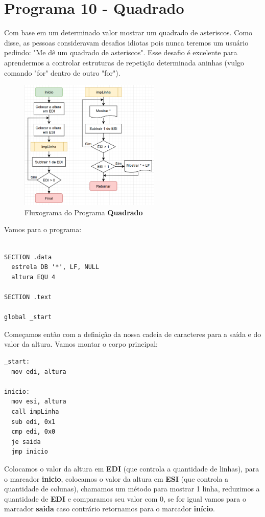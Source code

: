\section{Programa 10 - Quadrado}
Com base em um determinado valor mostrar um quadrado de asteriscos. Como disse, as pessoas consideravam desafios idiotas pois nunca teremos um usuário pedindo: "Me dê um quadrado de asteriscos". Esse desafio é excelente para aprendermos a controlar estruturas de repetição determinada aninhas (vulgo comando "for" dentro de outro "for"). 
\begin{figure}[H]
	\centering
	\includegraphics[width=0.6\textwidth]{Pictures/cap03/programa10}
	\caption{Fluxograma do Programa \textbf{Quadrado}}
\end{figure}

Vamos para o programa:

\begin{lstlisting}[]
%include 'bibliotecaE.inc'

SECTION .data
  estrela DB '*', LF, NULL
  altura EQU 4

SECTION .text

global _start
\end{lstlisting}

Começamos então com a definição da nossa cadeia de caracteres para a saída e do valor da altura. Vamos montar o corpo principal:

\begin{lstlisting}[]
_start:
  mov edi, altura

inicio:
  mov esi, altura
  call impLinha
  sub edi, 0x1
  cmp edi, 0x0
  je saida
  jmp inicio	
\end{lstlisting}

Colocamos o valor da altura em \textbf{EDI} (que controla a quantidade de linhas), para o marcador \textbf{inicio}, colocamos o valor da altura em \textbf{ESI} (que controla a quantidade de colunas), chamamos um método para mostrar 1 linha, reduzimos a quantidade de \textbf{EDI} e comparamos seu valor com 0, se for igual vamos para o marcador \textbf{saida} caso contrário retornamos para o marcador \textbf{início}.

